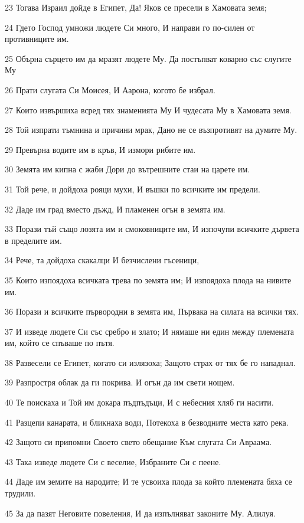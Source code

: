 \par 23 Тогава Израил дойде в Египет, Да! Яков се пресели в Хамовата земя;
\par 24 Гдето Господ умножи людете Си много, И направи го по-силен от противниците им.
\par 25 Обърна сърцето им да мразят людете Му. Да постъпват коварно със слугите Му
\par 26 Прати слугата Си Моисея, И Аарона, когото бе избрал.
\par 27 Които извършиха всред тях знаменията Му И чудесата Му в Хамовата земя.
\par 28 Той изпрати тъмнина и причини мрак, Дано не се възпротивят на думите Му.
\par 29 Превърна водите им в кръв, И измори рибите им.
\par 30 Земята им кипна с жаби Дори до вътрешните стаи на царете им.
\par 31 Той рече, и дойдоха рояци мухи, И въшки по всичките им предели.
\par 32 Даде им град вместо дъжд, И пламенен огън в земята им.
\par 33 Порази тъй също лозята им и смоковниците им, И изпочупи всичките дървета в пределите им.
\par 34 Рече, та дойдоха скакалци И безчислени гъсеници,
\par 35 Които изпоядоха всичката трева по земята им; И изпоядоха плода на нивите им.
\par 36 Порази и всичките първородни в земята им, Първака на силата на всички тях.
\par 37 И изведе людете Си със сребро и злато; И нямаше ни един между племената им, който се спъваше по пътя.
\par 38 Развесели се Египет, когато си излязоха; Защото страх от тях бе го нападнал.
\par 39 Разпростря облак да ги покрива. И огън да им свети нощем.
\par 40 Те поискаха и Той им докара пъдпъдъци, И с небесния хляб ги насити.
\par 41 Разцепи канарата, и бликнаха води, Потекоха в безводните места като река.
\par 42 Защото си припомни Своето свето обещание Към слугата Си Авраама.
\par 43 Така изведе людете Си с веселие, Избраните Си с пеене.
\par 44 Даде им земите на народите; И те усвоиха плода за който племената бяха се трудили.
\par 45 За да пазят Неговите повеления, И да изпълняват законите Му. Алилуя.

